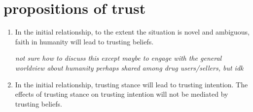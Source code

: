\documentclass[10pt]{article}
\begin{document}
\section*{propositions of trust}
\begin{enumerate}
\item In the initial relationship, to the extent the situation is novel and ambiguous, faith in humanity will lead to trusting beliefs.

\textit{not sure how to discuss this except maybe to engage with the general worldview about humanity perhaps shared among drug users/sellers, but idk}

\item In the initial relationship, trusting stance will lead to trusting intention. The effects of trusting stance on trusting intention will not be mediated by trusting beliefs.



\end{enumerate}
\end{document}
